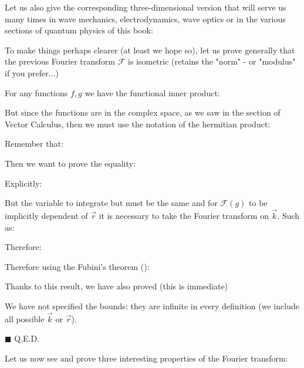 	Let us also give the corresponding three-dimensional version that will serve us many times in wave mechanics, electrodynamics, wave optics or in the various sections of quantum physics of this book:
	
	To make things perhaps clearer (at least we hope so), let us prove generally that the previous Fourier transform $\mathcal{F}$ is isometric (retains the "norm" - or "modulus" if you prefer...)
	
	\begin{theorem}
	For any functions $f, g$ we have the functional inner product:
	
	But since the functions are in the complex space, as we saw in the section of Vector Calculus, then we must use the notation of the hermitian product:
	
	Remember that:
	
	\end{theorem}
	\begin{dem}
	Then we want to prove the equality:
	
	Explicitly:
	
	But the variable to integrate but must be the same and for $\mathcal{F}(g)$ to be implicitly dependent of $\vec{r}$ it is necessary to take the Fourier transform on $\vec{k}$. Such as:
	
	Therefore:
	
	Therefore using the Fubini's theorem ():
	
	Thanks to this result, we have also proved (this is immediate)
	
	We have not specified the bounds: they are infinite in every definition (we include all possible $\vec{k}$ or $\vec{r}$).
	\begin{flushright}
		$\blacksquare$  Q.E.D.
	\end{flushright}
	\end{dem}
	Let us now see and prove three interesting properties of the Fourier transform:
